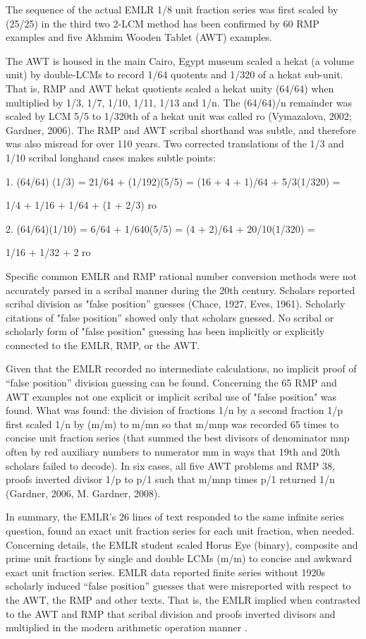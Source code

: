 \documentclass[12pt]{article}
\begin{document}
The sequence of the actual EMLR 1/8 unit fraction series was first scaled by (25/25) in the third two 2-LCM method has been confirmed by 60 RMP examples and five Akhmim Wooden Tablet (AWT) examples. 

The AWT is housed in the main Cairo, Egypt museum scaled a hekat (a volume unit) by double-LCMs to record 1/64 quotents and 1/320 of a hekat sub-unit. That is, RMP and AWT hekat quotients scaled a hekat unity (64/64) when multiplied by 1/3, 1/7, 1/10, 1/11, 1/13 and 1/n. The (64/64)/n remainder was scaled by LCM 5/5 to 1/320th of a hekat unit was called ro (Vymazalova, 2002; Gardner, 2006). The RMP and AWT scribal shorthand was subtle, and therefore was also misread for over 110 years. Two corrected translations of the 1/3 and 1/10 scribal longhand cases makes subtle points:

1.	(64/64) (1/3) = 21/64 + (1/192)(5/5)  = (16 + 4 + 1)/64 + 5/3(1/320) =

1/4 + 1/16 + 1/64 + (1 + 2/3) ro

2.	(64/64)(1/10) = 6/64 + 1/640(5/5) = (4 + 2)/64 + 20/10(1/320) = 

1/16 + 1/32 + 2 ro

Specific common EMLR and RMP rational number conversion methods were not accurately parsed in a scribal manner during the 20th century. Scholars reported scribal division as "false position” guesses (Chace, 1927, Eves, 1961). Scholarly citations of "false position” showed only that scholars guessed.
No scribal or scholarly form of "false position" guessing has been implicitly or explicitly connected to the EMLR, RMP, or the AWT.

Given that the EMLR recorded no intermediate calculations, no implicit proof of “false position” division guessing can be found. Concerning the 65 RMP and AWT examples not one explicit or implicit scribal use of "false position" was found. What was found: the division of fractions 1/n by a second fraction 1/p first scaled 1/n by (m/m) to m/mn so that m/mnp was recorded 65 times to concise unit fraction series (that summed the best divisors of denominator mnp often by red auxiliary numbers to numerator mm in ways that 19th and 20th scholars failed to decode). In six cases, all five AWT problems and RMP 38, proofs inverted divisor 1/p to p/1 such that m/mnp times p/1 returned 1/n (Gardner, 2006, M. Gardner, 2008). 

In summary, the EMLR’s 26 lines of text responded to the same infinite series question, found an exact unit fraction series for each unit fraction, when needed. Concerning details, the EMLR student scaled Horus Eye (binary), composite and prime unit fractions by single and double LCMs (m/m) to concise and awkward exact unit fraction series. EMLR data reported finite series without 1920s scholarly induced “false position” guesses that were misreported with respect to the AWT, the RMP and other texts. That is, the EMLR implied when contrasted to the AWT and RMP that scribal division and proofs inverted divisors and multiplied in the modern arithmetic operation manner .
\end{document}
